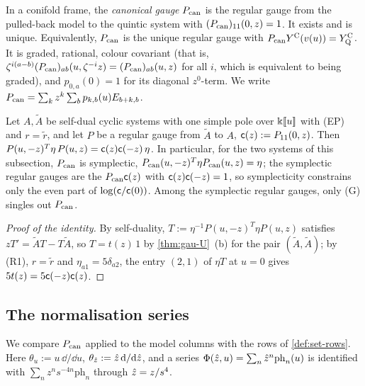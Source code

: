 \begin{defn}
\label{def:gau-can}
In a conifold frame, the \emph{canonical gauge} $P_{\mathrm{can}}$ is the regular gauge from the pulled-back model to the quintic system with $(P_{\mathrm{can}})_{11}(0,z)=1$. It exists and is unique. Equivalently, $P_{\mathrm{can}}$ is the unique regular gauge with $P_{\mathrm{can}}Y^{\mathrm{C}}(v(u))=Y^{\mathrm{C}}_{\mathrm{Q}}$. It is graded, rational, colour covariant (that is, $\zeta^{i(a-b)}(P_{\mathrm{can}})_{ab}(u,\zeta^{-i}z)=(P_{\mathrm{can}})_{ab}(u,z)$ for all $i$, which is equivalent to being graded), and $p_{0,a}(0)=1$ for its diagonal $z^0$-term. We write $P_{\mathrm{can}}=\sum_kz^k\sum_bp_{k,b}(u)E_{b+k,b}$.
\end{defn}

\begin{prop}
\label{prop:gau-symp}
Let $A,\tilde A$ be self-dual cyclic systems with one simple pole over $\Bbbk[\![ u ]\!]$ with (EP) and $r=\tilde r$, and let $P$ be a regular gauge from $\tilde A$ to $A$, $\mathsf{c}(z):=P_{11}(0,z)$. Then $P(u,-z)^T\eta\,P(u,z)=\mathsf{c}(z)\mathsf{c}(-z)\,\eta$. In particular, for the two systems of this subsection, $P_{\mathrm{can}}$ is symplectic, $P_{\mathrm{can}}(u,-z)^T\eta P_{\mathrm{can}}(u,z)=\eta$; the symplectic regular gauges are the $P_{\mathrm{can}}\mathsf{c}(z)$ with $\mathsf{c}(z)\mathsf{c}(-z)=1$, so symplecticity constrains only the even part of $\log(\mathsf{c}/\mathsf{c}(0))$. Among the symplectic regular gauges, only (G) singles out $P_{\mathrm{can}}$.
\end{prop}

\begin{proof}[Proof of the identity]
By self-duality, $T:=\eta^{-1}P(u,-z)^T\eta P(u,z)$ satisfies $zT'=\tilde AT-T\tilde A$, so $T=t(z)\,1$ by \cref{thm:gau-U}~(b) for the pair $(\tilde A,\tilde A)$; by (R1), $r=\tilde r$ and $\eta_{a1}=5\delta_{a2}$, the entry $(2,1)$ of $\eta T$ at $u=0$ gives $5t(z)=5\mathsf{c}(-z)\mathsf{c}(z)$.
\end{proof}

\subsection{The normalisation series}
\label{sec:gau-R0}

We compare $P_{\mathrm{can}}$ applied to the model columns with the rows of \cref{def:set-rows}. Here $\theta_u:=u\,\dd/\dd u$, $\theta_{\hat{z}}:=\hat{z}\,\mathrm{d}/\mathrm{d}\hat{z}$, and a series $\Phi(\hat{z},u)=\sum_n\hat{z}^n\mathrm{ph}_n(u)$ is identified with $\sum_nz^ns^{-4n}\mathrm{ph}_n$ through $\hat{z}=z/s^4$.

